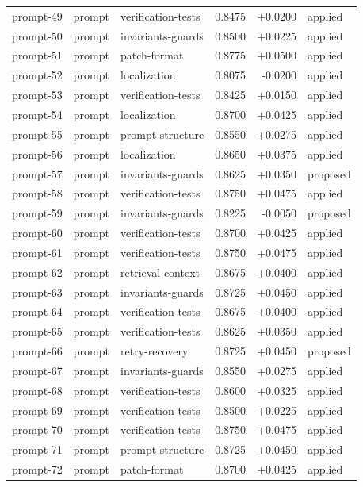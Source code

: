 \begin{center}
\begin{longtable}{llp{5.2cm}rrl}
prompt-49 & prompt & verification-tests & 0.8475 & +0.0200 & applied \\
prompt-50 & prompt & invariants-guards & 0.8500 & +0.0225 & applied \\
prompt-51 & prompt & patch-format & 0.8775 & +0.0500 & applied \\
prompt-52 & prompt & localization & 0.8075 & -0.0200 & applied \\
prompt-53 & prompt & verification-tests & 0.8425 & +0.0150 & applied \\
prompt-54 & prompt & localization & 0.8700 & +0.0425 & applied \\
prompt-55 & prompt & prompt-structure & 0.8550 & +0.0275 & applied \\
prompt-56 & prompt & localization & 0.8650 & +0.0375 & applied \\
prompt-57 & prompt & invariants-guards & 0.8625 & +0.0350 & proposed \\
prompt-58 & prompt & verification-tests & 0.8750 & +0.0475 & applied \\
prompt-59 & prompt & invariants-guards & 0.8225 & -0.0050 & proposed \\
prompt-60 & prompt & verification-tests & 0.8700 & +0.0425 & applied \\
prompt-61 & prompt & verification-tests & 0.8750 & +0.0475 & applied \\
prompt-62 & prompt & retrieval-context & 0.8675 & +0.0400 & applied \\
prompt-63 & prompt & invariants-guards & 0.8725 & +0.0450 & applied \\
prompt-64 & prompt & verification-tests & 0.8675 & +0.0400 & applied \\
prompt-65 & prompt & verification-tests & 0.8625 & +0.0350 & applied \\
prompt-66 & prompt & retry-recovery & 0.8725 & +0.0450 & proposed \\
prompt-67 & prompt & invariants-guards & 0.8550 & +0.0275 & applied \\
prompt-68 & prompt & verification-tests & 0.8600 & +0.0325 & applied \\
prompt-69 & prompt & verification-tests & 0.8500 & +0.0225 & applied \\
prompt-70 & prompt & verification-tests & 0.8750 & +0.0475 & applied \\
prompt-71 & prompt & prompt-structure & 0.8725 & +0.0450 & applied \\
prompt-72 & prompt & patch-format & 0.8700 & +0.0425 & applied \\

\end{longtable}
\end{center}

